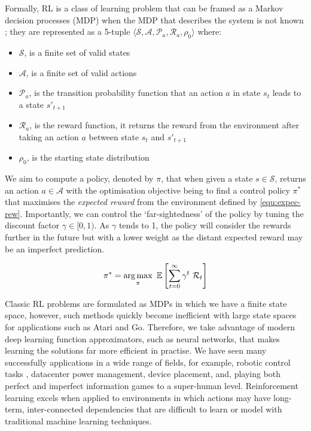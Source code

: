 Formally, RL is a class of learning problem that can be framed as a Markov decision processes (MDP) when the MDP that describes the system is not known \cite{bellman1957}; they are represented as a 5-tuple $\langle \mathcal{S}, \mathcal{A}, \mathcal{P}_a, \mathcal{R}_a, \rho_0 \rangle$ where:

\begin{itemize}
  \item $\mathcal{S}$, is a finite set of valid states
  \item $\mathcal{A}$, is a finite set of valid actions
  \item $\mathcal{P}_a$, is the transition probability function that an action $a$ in state $s_t$ leads to a state $s'_{t+1}$
  \item $\mathcal{R}_a$, is the reward function, it returns the reward from the environment after taking an action $a$ between state $s_t$ and $s'_{t+1}$
  \item $\rho_0$, is the starting state distribution
\end{itemize}

We aim to compute a policy, denoted by $\pi$, that when given a state $s \in \mathcal{S}$, returns an action $a \in \mathcal{A}$ with the optimisation objective being to find a control policy $\pi^*$ that maximises the \textit{expected reward} from the environment defined by \ref{equ:expec-rew}. Importantly, we can control the `far-sightedness' of the policy by tuning the discount factor $\gamma \in [0, 1)$. As $\gamma$ tends to 1, the policy will consider the rewards further in the future but with a lower weight as the distant expected reward may be an imperfect prediction.

\begin{equation}
  \label{equ:expec-rew}
  \pi^* = \operatorname*{arg\,max}_\pi~\mathbb{E} \left[ \sum^\infty_{t=0} \gamma^t~\mathcal{R}_t \right]
\end{equation}

Classic RL problems are formulated as MDPs in which we have a finite state space, however, such methods quickly become inefficient with large state spaces for applications such as Atari and Go. Therefore, we take advantage of modern deep learning function approximators, such as neural networks, that makes learning the solutions far more efficient in practise. We have seen many successfully applications in a wide range of fields, for example, robotic control tasks \cite{openai2019solving}, datacenter power management, device placement, and, playing both perfect and imperfect information games to a super-human level. Reinforcement learning excels when applied to environments in which actions may have long-term, inter-connected dependencies that are difficult to learn or model with traditional machine learning techniques.

